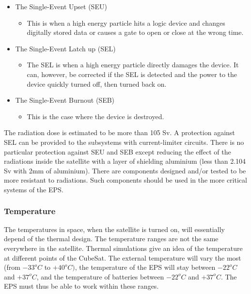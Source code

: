 \begin{itemize}
\item The Single-Event Upset (SEU)
\begin{itemize}
\item This is when a high energy particle hits a logic device and changes digitally stored data or causes a gate to open or close at the wrong time.
\end{itemize}
\item The Single-Event Latch up (SEL)
\begin{itemize}
\item The SEL is when a high energy particle directly damages the device. It can, however, be corrected if the SEL is detected and the power to the device quickly turned off, then turned back on.
\end{itemize}
\item The Single-Event Burnout (SEB)
\begin{itemize}
\item This is the case where the device is destroyed.
\end{itemize}

\end{itemize}


The radiation dose is estimated to be more than 105 Sv. A protection against SEL can be provided to the subsystems with current-limiter circuits. There is no particular protection against SEU and SEB except reducing the effect of the radiations inside the satellite with a layer of shielding aluminium (less than 2.104 Sv with 2mm of aluminium). There are components designed and/or tested to be more resistant to radiations. Such components should be used in the more critical systems of the EPS.
\\ 
\subsubsection*{Temperature}

The temperatures in space, when the satellite is turned on, will essentially depend of the thermal design. The temperature ranges are not the same everywhere in the satellite. Thermal simulations give an idea of the temperature at different points of the CubeSat. The external temperature will vary the most (from $-33^{o}C$ to $+40^{o}C)$, the temperature of the EPS will stay between $-22^{o}C$ and $+37^{o}C$, and the temperature of batteries between $-22^{o}C$ and $+37^{o}C$. The EPS must thus be able to work within these ranges.

